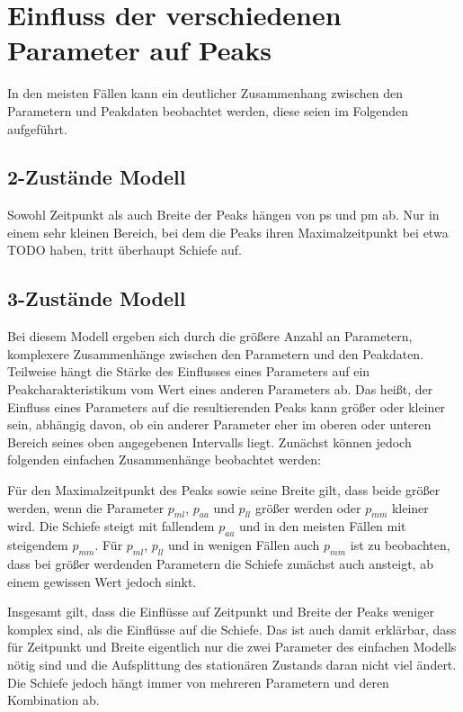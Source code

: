 \section{Einfluss der verschiedenen Parameter auf Peaks}

In den meisten Fällen kann ein deutlicher Zusammenhang zwischen den Parametern und Peakdaten beobachtet werden, diese seien im Folgenden aufgeführt.

\subsection{2-Zustände Modell} 

Sowohl Zeitpunkt als auch Breite der Peaks hängen von ps und pm ab.
Nur in einem sehr kleinen Bereich, bei dem die Peaks ihren Maximalzeitpunkt bei etwa TODO haben, tritt überhaupt Schiefe auf. 


\subsection{3-Zustände Modell}
Bei diesem Modell ergeben sich durch die größere Anzahl an Parametern, komplexere Zusammenhänge zwischen den Parametern und den Peakdaten. Teilweise hängt die Stärke des Einflusses eines Parameters auf ein Peakcharakteristikum vom Wert eines anderen Parameters ab. Das heißt, der Einfluss eines Parameters auf die resultierenden Peaks kann größer oder kleiner sein, abhängig davon, ob ein anderer Parameter eher im oberen oder unteren Bereich seines oben angegebenen Intervalls liegt.
Zunächst können jedoch folgenden einfachen Zusammenhänge beobachtet werden:

Für den Maximalzeitpunkt des Peaks sowie seine Breite gilt, dass beide größer werden, wenn die Parameter $p_{ml}$, $p_{aa}$ und $p_{ll}$ größer werden oder $p_{mm}$ kleiner wird. 
Die Schiefe steigt mit fallendem $p_{aa}$ und in den meisten Fällen mit steigendem $p_{mm}$. Für $p_{ml}$, $p_{ll}$ und in wenigen Fällen auch $p_{mm}$ ist zu beobachten, dass bei größer werdenden Parametern die Schiefe zunächst auch ansteigt, ab einem gewissen Wert jedoch sinkt.

Insgesamt gilt, dass die Einflüsse auf Zeitpunkt und Breite der Peaks weniger komplex sind, als die Einflüsse auf die Schiefe. Das ist auch damit erklärbar, dass für Zeitpunkt und Breite eigentlich nur die zwei Parameter des einfachen Modells nötig sind und die Aufsplittung des stationären Zustands daran nicht viel ändert. Die Schiefe jedoch hängt immer von mehreren Parametern und deren Kombination ab.

